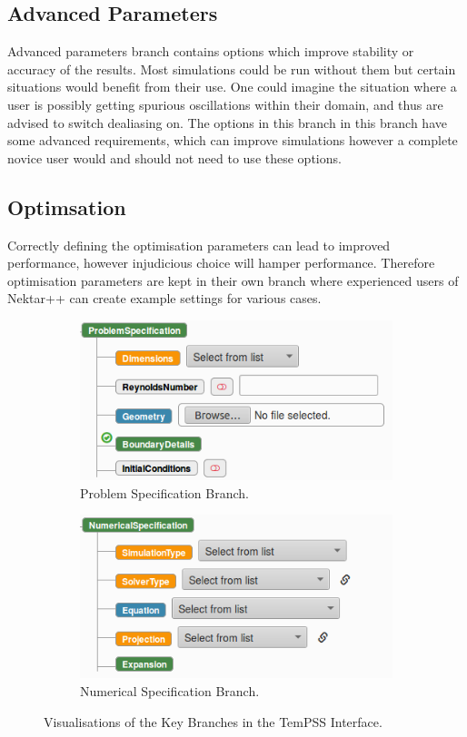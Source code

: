 \documentclass[11pt, a4paper]{report}
\begin{document}
\subsection{Advanced Parameters}
Advanced parameters branch contains options which improve stability or accuracy of the results. Most simulations could be run without them but certain situations would benefit from their use. One could imagine the situation where a user is possibly getting spurious oscillations within their domain, and thus are advised to switch dealiasing on. The options in this branch in this branch have some advanced requirements, which can improve simulations however a complete novice user would and should not need to use these options.

\subsection{Optimsation}
Correctly defining the optimisation parameters can lead to improved performance, however injudicious choice will hamper performance. Therefore optimisation parameters are kept in their own branch where experienced users of Nektar++ can create example settings for various cases.

\begin{figure}[!htb]
\centering
\begin{subfigure}{.5\textwidth}
  \centering
  \includegraphics[width=1.\linewidth]{problem_spec}
  \caption{Problem Specification Branch.}
  \label{fig:problem_spec}
\end{subfigure}%
\begin{subfigure}{.5\textwidth}
  \centering
  \includegraphics[width=1.\linewidth]{numerical_spec}
  \caption{Numerical Specification Branch.}
  \label{fig:numerical_spec}
\end{subfigure}
\caption{Visualisations of the Key Branches in the TemPSS Interface.}
\label{fig:branches}
\end{figure}
\end{document}

